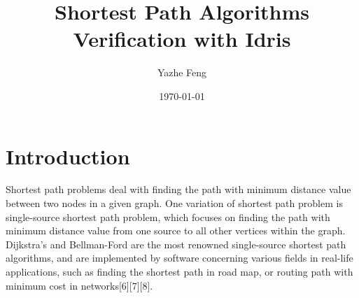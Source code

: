 \documentclass[11pt, a4paper]{article} %
\title{Shortest Path Algorithms Verification with Idris} %
\author{
Yazhe Feng %
  }
\date{\small \today} %
\theoremstyle{definition}
\begin{document}


%

\maketitle %


\setcounter{page}{1} %

\section{Introduction} %
Shortest path problems deal with finding the path with minimum distance value between two nodes in a given graph. One variation of shortest path problem is single-source shortest path problem, which focuses on finding the path with minimum distance value from one source to all other vertices within the graph. Dijkstra's and Bellman-Ford are the most renowned single-source shortest path algorithms, and are implemented by software concerning various fields in real-life applications, such as finding the shortest path in road map, or routing path with minimum cost in networks[6][7][8]. 
\\
\end{document}

